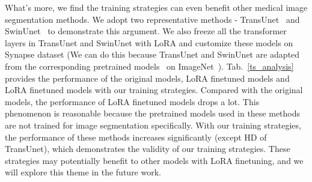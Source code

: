 \documentclass[runningheads]{llncs}
\begin{document}
What's more, we find the training strategies can even benefit other medical image segmentation methods. We adopt two representative methods - TransUnet~\cite{chen2021transunet} and SwinUnet~\cite{swinunet} to demonstrate this argument. We also freeze all the transformer layers in TransUnet and SwinUnet with LoRA and customize these models on Synapse dataset (We can do this because TransUnet and SwinUnet are adapted from the corresponding pretrained models~\cite{dosovitskiy2021an,liu2021Swin} on ImageNet~\cite{deng2009imagenet}). Tab.~\ref{ts_analysis} provides the performance of the original models, LoRA finetuned models and LoRA finetuned models with our training strategies. Compared with the original models, the performance of LoRA finetuned models drops a lot. This phenomenon is reasonable because the pretrained models used in these methods are not trained for image segmentation specifically. With our training strategies, the performance of these methods increases significantly (except HD of TransUnet), which demonstrates the validity of our training strategies. These strategies may potentially benefit to other models with LoRA finetuning, and we will explore this theme in the future work.



\begin{table*}[t]
\begin{center}
\caption{Ablation study about our training strategies on other medical image segmentation methods.}
\label{ts_analysis}
\end{center}
\end{table*}
\end{document}
